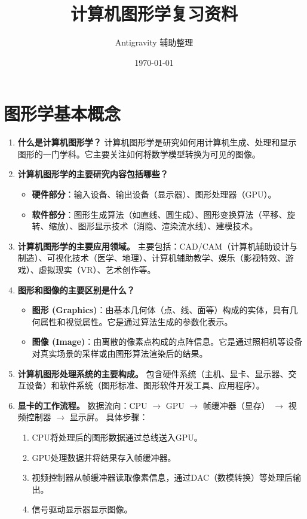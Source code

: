 \documentclass[UTF8]{ctexart}
\title{计算机图形学复习资料}
\author{Antigravity 辅助整理}
\date{\today}
\begin{document}
\maketitle
\tableofcontents

\newpage

\section{图形学基本概念}

\begin{enumerate}
    \item \textbf{什么是计算机图形学？}
    计算机图形学是研究如何用计算机生成、处理和显示图形的一门学科。它主要关注如何将数学模型转换为可见的图像。

    \item \textbf{计算机图形学的主要研究内容包括哪些？}
    \begin{itemize}
        \item \textbf{硬件部分}：输入设备、输出设备（显示器）、图形处理器（GPU）。
        \item \textbf{软件部分}：图形生成算法（如直线、圆生成）、图形变换算法（平移、旋转、缩放）、图形显示技术（消隐、渲染流水线）、建模技术。
    \end{itemize}

    \item \textbf{计算机图形学的主要应用领域。}
    主要包括：CAD/CAM（计算机辅助设计与制造）、可视化技术（医学、地理）、计算机辅助教学、娱乐（影视特效、游戏）、虚拟现实（VR）、艺术创作等。

    \item \textbf{图形和图像的主要区别是什么？}
    \begin{itemize}
        \item \textbf{图形 (Graphics)}：由基本几何体（点、线、面等）构成的实体，具有几何属性和视觉属性。它是通过算法生成的参数化表示。
        \item \textbf{图像 (Image)}：由离散的像素点构成的点阵信息。它是通过照相机等设备对真实场景的采样或由图形算法渲染后的结果。
    \end{itemize}

    \item \textbf{计算机图形处理系统的主要构成。}
    包含硬件系统（主机、显卡、显示器、交互设备）和软件系统（图形标准、图形软件开发工具、应用程序）。

    \item \textbf{显卡的工作流程。}
    数据流向：CPU $\to$ GPU $\to$ 帧缓冲器（显存） $\to$ 视频控制器 $\to$ 显示屏。
    具体步骤：
    \begin{enumerate}
        \item CPU将处理后的图形数据通过总线送入GPU。
        \item GPU处理数据并将结果存入帧缓冲器。
        \item 视频控制器从帧缓冲器读取像素信息，通过DAC（数模转换）等处理后输出。
        \item 信号驱动显示器显示图像。
    \end{enumerate}


\end{enumerate}
\end{document}
